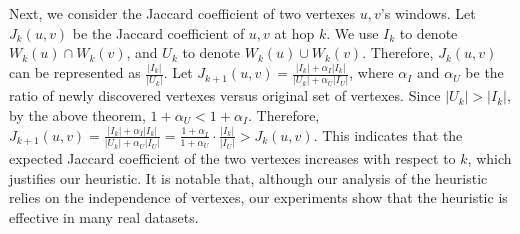 Next, we consider the Jaccard coefficient of two vertexes $u,v$'s windows. Let $J_k(u,v)$ be the 
Jaccard coefficient of $u,v$ at hop $k$. We use $I_k$ to denote $W_k(u) \cap W_k(v)$, and $U_k$ to denote
$W_k(u) \cup W_k(v)$. Therefore, $J_k(u,v)$ can be represented as $\frac{|I_k|}{|U_k|}$. Let
$J_{k+1}(u,v) =\frac{|I_k| + \alpha_I|I_k|}{|U_k|+ \alpha_U|I_U|}$, where $\alpha_I$ and $\alpha_U$ 
be the ratio of newly discovered vertexes versus original set of vertexes.
Since $|U_k| > |I_k|$, by the above theorem, $1+\alpha_U < 1+\alpha_I$. Therefore, $J_{k+1}(u,v)=\frac{|I_k| + \alpha_I|I_k|}{|U_k|+ \alpha_U|I_U|}= \frac{1+\alpha_I}{1+\alpha_U}\cdot\frac{|I_k|}{|I_U|} > J_k(u,v)$. This indicates that
the expected Jaccard coefficient of the two vertexes increases with respect to $k$, which justifies
our heuristic. 
It is notable that, although our analysis of the heuristic relies on the independence of vertexes,
our experiments show that the heuristic is effective in many real datasets.

